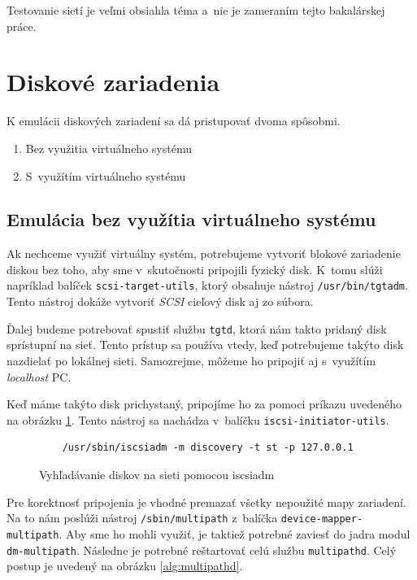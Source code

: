 Testovanie sietí je veľmi obsiahla téma a~nie je zameraním tejto bakalárskej
práce.

%
%

\section{Diskové zariadenia}

K emulácii diskových zariadení sa dá pristupovať dvoma spôsobmi. 

\begin{enumerate}
    \item Bez využitia virtuálneho systému \label{item:without-virt-system}
    \item S~využítím virtuálneho systému \label{item:with-virt-system}
\end{enumerate}

%
%

\subsection{Emulácia bez využítia virtuálneho systému}

Ak nechceme využiť virtuálny systém, potrebujeme vytvoriť blokové zariadenie
diskou bez toho, aby sme v~skutočnosti pripojili fyzický disk. K~tomu slúži
napríklad balíček \texttt{scsi-target-utils}, ktorý obsahuje nástroj
\texttt{/usr/bin/tgtadm}.  Tento nástroj dokáže vytvoriť \emph{SCSI} cieľový
disk aj zo súbora. 

Ďalej budeme potrebovať spustiť službu \texttt{tgtd}, ktorá nám takto pridaný
disk sprístupní na sieť. Tento prístup sa používa vtedy, keď potrebujeme takýto
disk nazdielať po lokálnej sieti. Samozrejme, môžeme ho pripojiť aj s~využítím
\emph{localhost} PC.


Keď máme takýto disk prichystaný, pripojíme ho za pomoci príkazu uvedeného na
obrázku \ref{alg:iscsiadm-discovery}. Tento nástroj sa nachádza v~balíčku
\texttt{iscsi-initiator-utils}.

\begin{figure}[H]
\begin{lstlisting}
    /usr/sbin/iscsiadm -m discovery -t st -p 127.0.0.1
\end{lstlisting}
\caption{Vyhľadávanie diskov na sieti pomocou iscsiadm}
\label{alg:iscsiadm-discovery}
\end{figure}

Pre korektnosť pripojenia je vhodné premazať všetky nepoužité mapy zariadení.
Na to nám poslúži nástroj \texttt{/sbin/multipath} z~balíčka
\texttt{device-mapper-multipath}. Aby sme ho mohli využiť, je taktiež potrebné
zaviesť do jadra modul \texttt{dm-multipath}. Následne je potrebné reštartovať celú
službu \texttt{multipathd}. Celý postup je uvedený na obrázku
\ref{alg:multipathd}.

